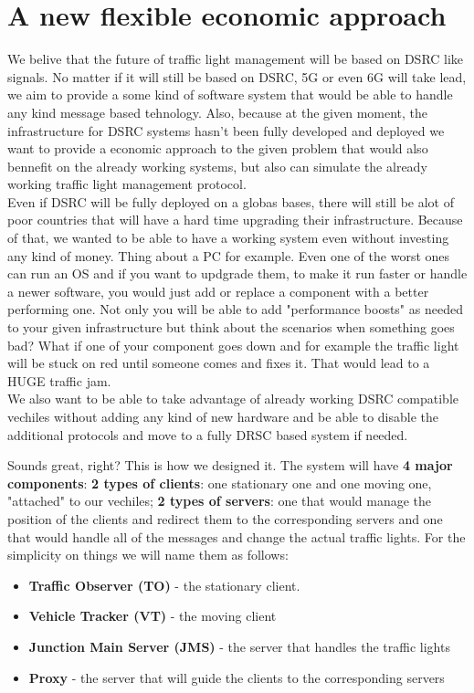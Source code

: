 \documentclass[17pt]{article}
\begin{document}
\section{A new flexible economic approach}
\indent \indent
We belive that the future of traffic light management will be
based on DSRC like signals. No matter if it will still be based 
on DSRC, 5G or even 6G will take lead, we aim to provide a some kind of
software system that would be able to handle any kind message based 
tehnology. Also, because at the given moment, the infrastructure for
DSRC systems hasn't been fully developed and deployed we want to
provide a economic approach to the given problem that would also bennefit
on the already working systems, but also can simulate the already
working traffic light management protocol.\\
\indent \indent
Even if DSRC will be fully deployed on a globas bases, there will still be
alot of poor countries that will have a hard time upgrading their infrastructure.
Because of that, we wanted to be able to have a working system even without 
investing any kind of money. Thing about a PC for example. Even one of the worst
ones can run an OS and if you want to updgrade them, to make it run faster or
handle a newer software, you would just add or replace a component with a better
performing one. Not only you will be able to add "performance boosts" as needed
to your given infrastructure but think about the scenarios when something goes bad?
What if one of your component goes down and for example the traffic light will
be stuck on red until someone comes and fixes it. That would lead to a
HUGE traffic jam.\\
\indent \indent
We also want to be able to take advantage of already working DSRC compatible
vechiles without adding any kind of new hardware  and be able to 
disable the additional protocols and move to a fully DRSC based
system if needed.

Sounds great, right? This is how we designed it. The system will have \textbf{4 major
components}: \textbf{2 types of clients}: one stationary one and one moving one, 
"attached" to our vechiles; \textbf{2 types of servers}: one that would manage the
position of the clients and redirect them to the corresponding servers
and one that would handle all of the messages and change the actual traffic lights.
For the simplicity on things we will name them as follows:
\begin{itemize}
    \item \textbf{Traffic Observer (TO)} - the stationary client.
    \item \textbf{Vehicle Tracker (VT)} - the moving client
    \item \textbf{Junction Main Server (JMS)} - the server that handles the traffic lights
    \item \textbf{Proxy} - the server that will guide the clients to the corresponding
    servers
\end{itemize}
\end{document}
